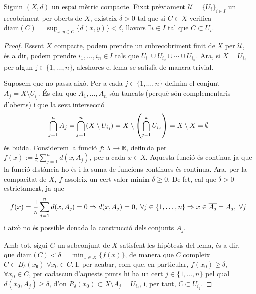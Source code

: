 \documentclass[../main.tex]{subfiles}
\begin{document}
\begin{lema}
\label{lema:nombredelebesgue} Siguin $(X,d)$ un espai mètric compacte. Fixat prèviament $\mathcal{U}=\{U_i\}_{i\in I}$ un recobriment per oberts de $X$, existeix $\delta>0$ tal que si $C\subset X$ verifica $\mathrm{diam}(C) = \sup_{x,y\in C}\{d(x,y)\}<\delta$, llavors $\exists i\in I$ tal que $C\subset U_i$.
\end{lema}
\begin{proof}
Essent $X$ compacte, podem prendre un subrecobriment finit de $X$ per $\mathcal{U}$, és a dir, podem prendre $i_1,\ldots,i_n\in I$ tals que $U_{i_1}\cup U_{i_2}\cup\cdots\cup U_{i_n}$. Ara, si $X = U_{i_j}$ per algun $j\in \{1,\ldots,n\}$, aleshores el lema se satisfà de manera trivial.

Suposem que no passa això. Per a cada $j\in\{1,\ldots,n\}$ definim el conjunt $A_j = X\setminus U_{i_j}$. És clar que $A_1,\ldots,A_n$ són tancats (perquè són complementaris d'oberts) i que la seva intersecció
\begin{equation}
    \notag
    \bigcap_{j=1}^n A_j = \bigcap_{j=1}^n(X\setminus U_{i_j}) = X\setminus \left(\bigcap_{j=1}^n U_{i_j}\right) = X\setminus X = \emptyset
\end{equation}
és buida. Considerem la funció $f:X\rightarrow \mathbb{R}$, definida per $f(x) := \frac{1}{n}\sum_{j=1}^n d(x,A_j)$, per a cada $x\in X$. Aquesta funció és contínua ja que la funció distància ho és i la suma de funcions contínues és contínua. Ara, per la compacitat de $X$, $f$ assoleix un cert valor mínim $\delta\geq 0$. De fet, cal que $\delta>0$ estrictament, ja que
\begin{equation}
    \notag
    f(x) = \frac{1}{n}\sum_{j=1}^n d(x,A_j) = 0\Rightarrow d(x,A_j) = 0,\;\forall j\in\{1,\ldots,n\}\Rightarrow x\in \overline{A_j} = A_j,\;\forall j
\end{equation}
i això no és possible donada la construcció dels conjunts $A_j$.

Amb tot, sigui $C$ un subconjunt de $X$ satisfent les hipòtesis del lema, és a dir, que $\mathrm{diam}(C)<\delta = \min_{x\in X}\{f(x)\}$, de manera que $C$ compleix $C\subset B_\delta(x_0)\;\forall x_0\in C$. I, per acabar, com que, en particular, $f(x_0)\geq \delta$, $\forall x_0\in C$, per cadascun d'aquests punts hi ha un cert $j\in \{1,\ldots,n\}$ pel qual $d(x_0,A_j)\geq \delta$, d'on $B_\delta(x_0)\subset X\setminus A_j = U_{i_j}$, i, per tant, $C\subset U_{i_j}$.
\end{proof}
\end{document}
